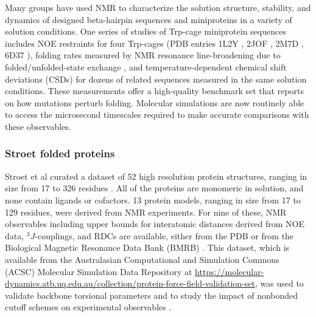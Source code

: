 \documentclass[9pt,review]{livecoms}
\begin{document}
Many groups have used NMR to characterize the solution structure, stability, and dynamics of designed beta-hairpin sequences \cite{blanco_short_1994,ramirez-alvarado_novo_1996,de_alba_turn_1997,maynard_origin_1998,stanger_rules_1998,cochran_tryptophan_2001,ramirez-alvarado_elongation_2001,pastor_combinatorial_2002,russell_stability_2003,skelton_hairpin_2003,fesinmeyer_enhanced_2004,espinosa_autonomously_2005,andersen_minimization_2006,honda_crystal_2008,kier_stabilizing_2010,scian_mutational_2013,jimenez_design_2014,anderson_nascent_2016,morales_design_2019,richaud_folding_2021,peintner_pushing_2022} and miniproteins \cite{struthers_design_1996,mcknight_nmr_1997,struthers_design_1998,imperiali_uniquely_1999,vermeulen_solution_2004,cornilescu_solution_2007,gronwald_evolutionary_2008} in a variety of solution conditions.
One series of studies of Trp-cage miniprotein sequences \cite{neidigh_designing_2002,lin_helical_2004,barua_trp-cage_2008,scian_crystal_2012,byrne_circular_2013,graham_reversing_2019} includes NOE restraints for four Trp-cages (PDB entries 1L2Y \cite{neidigh_designing_2002}, 2JOF \cite{barua_trp-cage_2008}, 2M7D \cite{byrne_circular_2013}, 6D37 \cite{graham_reversing_2019}), folding rates measured by NMR resonance line-broadening due to folded/unfolded-state exchange \cite{scian_mutational_2013,byrne_folding_2014}, and temperature-dependent chemical shift deviations (CSDs) for dozens of related sequences measured in the same solution conditions.
These measurements offer a high-quality benchmark set that reports on how mutations perturb folding.
Molecular simulations are now routinely able to access the microsecond timescales required to make accurate comparisons with these observables.

\subsubsection{Stroet folded proteins}
\label{sub2:stroet}

Stroet et al curated a dataset of 52 high resolution protein structures, ranging in size from 17 to 326 residues \cite{stroet_validation_2024}.
All of the proteins are monomeric in solution, and none contain ligands or cofactors.
13 protein models, ranging in size from 17 to 129 residues, were derived from NMR experiments.
For nine of these, NMR observables including upper bounds for interatomic distances derived from NOE data, $^3J$-couplings, and RDCs are available, either from the PDB or from the Biological Magnetic Resonance Data Bank (BMRB) \cite{ulrich_biomagresbank_2008,romero_biomagresbank_2020,hoch_biological_2023}. This dataset, which is available from the Australasian Computational and Simulation Commons (ACSC) Molecular Simulation Data Repository \cite{mark_australasian_2022} at \url{https://molecular-dynamics.atb.uq.edu.au/collection/protein-force-field-validation-set}, was used to validate backbone torsional parameters \cite{diem_hamiltonian_2020} and to study the impact of nonbonded cutoff schemes on experimental observables \cite{diem_effect_2020}.
\end{document}
